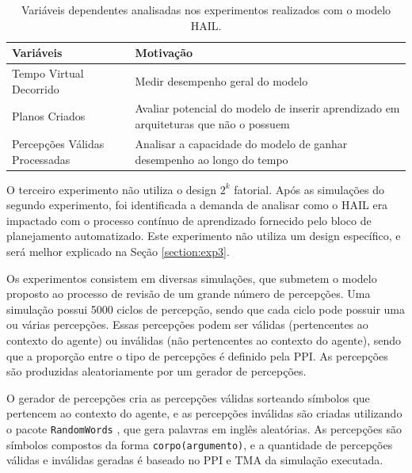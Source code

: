 \begin{table}[h!]
    \begin{center}
        \caption{ Variáveis dependentes analisadas nos experimentos realizados com o modelo HAIL. }
        \label{table:experiments_variables}
        \begin{tabularx}{\textwidth}{ |Y|Y| }
            \hline
            \textbf{Variáveis} & \textbf{Motivação} \\
            \hline
            Tempo Virtual Decorrido & Medir desempenho geral do modelo \\
            \hline
            Planos Criados & Avaliar potencial do modelo de inserir aprendizado em arquiteturas que não o possuem \\
            \hline
            Percepções Válidas Processadas & Analisar a capacidade do modelo de ganhar desempenho ao longo do tempo\\
            \hline
        \end{tabularx}{}
    \end{center}{}
\end{table}

O terceiro experimento não utiliza o design $2^k$ fatorial. Após as simulações do segundo experimento, foi identificada a demanda de analisar como o HAIL era impactado com o processo contínuo de aprendizado fornecido pelo bloco de planejamento automatizado. Este experimento não utiliza um design específico, e será melhor explicado na Seção \ref{section:exp3}.

Os experimentos consistem em diversas simulações, que submetem o modelo proposto ao processo de revisão de um grande número de percepções. Uma simulação possui 5000 ciclos de percepção, sendo que cada ciclo pode possuir uma ou várias percepções. Essas percepções podem ser válidas (pertencentes ao contexto do agente) ou inválidas (não pertencentes ao contexto do agente), sendo que a proporção entre o tipo de percepções é definido pela PPI. As percepções são produzidas aleatoriamente por um gerador de percepções. 

O gerador de percepções cria as percepções válidas sorteando símbolos que pertencem ao contexto do agente, e as percepções inválidas são criadas utilizando o pacote \texttt{RandomWords} \cite{pipRandomWords2}, que gera palavras em inglês aleatórias. As percepções são símbolos compostos da forma \texttt{corpo(argumento)}, e a quantidade de percepções válidas e inválidas geradas é baseado no PPI e TMA da simulação executada.

